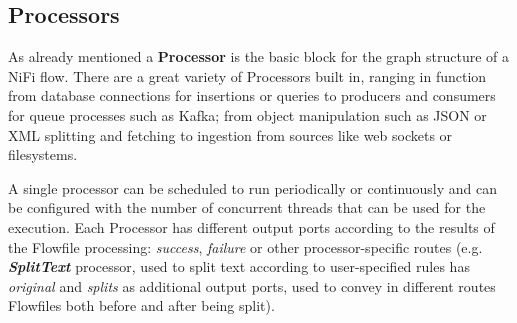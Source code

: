\subsection{Processors}

As already mentioned a \textbf{Processor} is the basic block for the graph structure of a NiFi flow. There are a great variety of Processors built in, ranging in function from database connections for insertions or queries to producers and consumers for queue processes such as Kafka; from object manipulation such as JSON or XML splitting and fetching to ingestion from sources like web sockets or filesystems.

A single processor can be scheduled to run periodically or continuously and can be configured with the number of concurrent threads that can be used for the execution. Each Processor has different output ports according to the results of the Flowfile processing: \textit{success}, \textit{failure} or other processor-specific routes (e.g. \textit{\textbf{SplitText}} processor, used to split text according to user-specified rules has \textit{original} and \textit{splits} as additional output ports, used to convey in different routes Flowfiles both before and after being split).